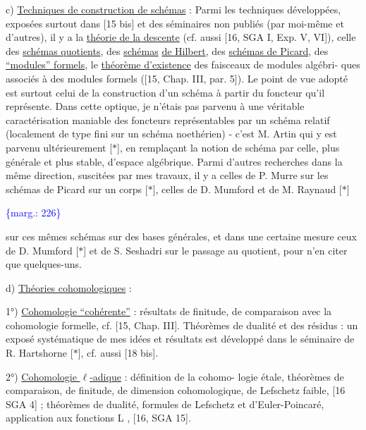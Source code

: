 \documentclass[11pt]{article}
\newcommand{\scanpage}[1]{\par\bigskip\noindent{\small\sffamily[scan #1]}\par}
\newcommand{\mspage}[1]{{\small\sffamily[p.\,#1]}}
\newcommand{\margin}[1]{\textcolor{blue}{\{\textsf{marg.:} #1\}}}
\newcommand{\uline}[1]{\underline{#1}}
\begin{document}
c) \uline{Techniques de construction de schémas} : Parmi les
techniques développées, exposées surtout dans [15 bis]
et des séminaires non publiés (par moi-même et d'autres),
il y a la \uline{théorie de la descente} (cf. aussi [16, SGA I,
Exp. V, VI]), celle des \uline{schémas quotients}, des \uline{schémas}
\uline{de Hilbert}, des \uline{schémas de Picard}, des \uline{``modules'' formels},
le \uline{théorème d'existence} des faisceaux de modules algébri-%
ques associés à des modules formels ([15, Chap. III,
par. 5]). Le point de vue adopté est surtout celui de
la construction d'un schéma à partir du foncteur qu'il
représente. Dans cette optique, je n'étais pas parvenu
à une véritable caractérisation maniable des foncteurs
représentables par un schéma relatif (localement de type
fini sur un schéma noethérien) - c'est M. Artin qui y
est parvenu ultérieurement [$*$], en remplaçant la notion
de schéma par celle, plus générale et plus stable,
d'espace algébrique. Parmi d'autres recherches dans
la même direction, suscitées par mes travaux, il y a
celles de P. Murre sur les schémas de Picard sur un
corps [$*$], celles de D. Mumford et de M. Raynaud [$*$]

\margin{226}

\clearpage
\scanpage{119/227}
\mspage{. 14 .}

sur ces mêmes schémas sur des bases générales, et dans
une certaine mesure ceux de D. Mumford [$*$] et de
S. Seshadri sur le passage au quotient, pour n'en
citer que quelques-uns.

d) \uline{Théories cohomologiques} :

1°) \uline{Cohomologie ``cohérente''} : résultats de finitude,
de comparaison avec la cohomologie formelle, cf.
[15, Chap. III]. Théorèmes de dualité et des résidus :
un exposé systématique de mes idées et résultats est
développé dans le séminaire de R. Hartshorne [$*$],
cf. aussi [18 bis].

2°) \uline{Cohomologie $\ell$-adique} : définition de la cohomo-%
logie étale, théorèmes de comparaison, de finitude,
de dimension cohomologique, de Lefschetz faible,
[16 SGA 4] ; théorèmes de dualité, formules de Lefschetz
et d'Euler-Poincaré, application aux fonctions L ,
[16, SGA 15].
\end{document}
